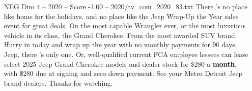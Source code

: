 \begin{textsample}{NEG Dim 4 – 2020 – Score -1.00 – 2020/tv\_com\_2020\_83.txt}  \label{ex:f4_neg_070}
There 's no place like home for the holidays, and no place like the Jeep Wrap-Up the Year sales event for great deals.
On the most capable Wrangler ever, or the most luxurious vehicle in its class, the Grand Cherokee.
From the most awarded SUV brand.
Hurry in today and wrap up the year with no monthly payments for 90 days.
Jeep, there 's only one.
Or, well-qualified current FCA employee lessees can lease select 2025 Jeep Grand Cherokee models and dealer stock for \$280 a \textbf{month}, with \$280 due at signing and zero down payment.
See your Metro Detroit Jeep brand dealers.
Thanks for watching.

\end{textsample}
